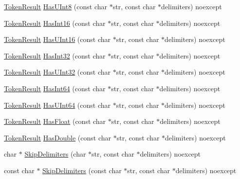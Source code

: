 \begin{DoxyCompactItemize}
\item 
\hyperlink{namespacemage_a2178ba2411db5912f41b2e7698c2037d}{Token\+Result} \hyperlink{namespacemage_ac2478814d8f43d6217c54f97c4fd3034}{Has\+U\+Int8} (const char $\ast$str, const char $\ast$delimiters) noexcept
\item 
\hyperlink{namespacemage_a2178ba2411db5912f41b2e7698c2037d}{Token\+Result} \hyperlink{namespacemage_a0436390022f56adaede7113217ca8333}{Has\+Int16} (const char $\ast$str, const char $\ast$delimiters) noexcept
\item 
\hyperlink{namespacemage_a2178ba2411db5912f41b2e7698c2037d}{Token\+Result} \hyperlink{namespacemage_a52a49efce40c0ad5c50340036e7a74fa}{Has\+U\+Int16} (const char $\ast$str, const char $\ast$delimiters) noexcept
\item 
\hyperlink{namespacemage_a2178ba2411db5912f41b2e7698c2037d}{Token\+Result} \hyperlink{namespacemage_ab476d1a2ac6d4f0459ccdc5f84445b68}{Has\+Int32} (const char $\ast$str, const char $\ast$delimiters) noexcept
\item 
\hyperlink{namespacemage_a2178ba2411db5912f41b2e7698c2037d}{Token\+Result} \hyperlink{namespacemage_a5d4c13b907e688d2a743aabd15e61821}{Has\+U\+Int32} (const char $\ast$str, const char $\ast$delimiters) noexcept
\item 
\hyperlink{namespacemage_a2178ba2411db5912f41b2e7698c2037d}{Token\+Result} \hyperlink{namespacemage_a51c4032544fb55800a905ccd85ca5e99}{Has\+Int64} (const char $\ast$str, const char $\ast$delimiters) noexcept
\item 
\hyperlink{namespacemage_a2178ba2411db5912f41b2e7698c2037d}{Token\+Result} \hyperlink{namespacemage_af018725ebdee13dad295cc607db93f38}{Has\+U\+Int64} (const char $\ast$str, const char $\ast$delimiters) noexcept
\item 
\hyperlink{namespacemage_a2178ba2411db5912f41b2e7698c2037d}{Token\+Result} \hyperlink{namespacemage_a6f2a789cad13443930a6edb96a05c32b}{Has\+Float} (const char $\ast$str, const char $\ast$delimiters) noexcept
\item 
\hyperlink{namespacemage_a2178ba2411db5912f41b2e7698c2037d}{Token\+Result} \hyperlink{namespacemage_a6264a671d1957908b6a4dc603a3bcdbe}{Has\+Double} (const char $\ast$str, const char $\ast$delimiters) noexcept
\item 
char $\ast$ \hyperlink{namespacemage_a66ebc90ee456bc298de657fce4586fd7}{Skip\+Delimiters} (char $\ast$str, const char $\ast$delimiters) noexcept
\item 
const char $\ast$ \hyperlink{namespacemage_a2bd955a8de0502e298a8435122e7a093}{Skip\+Delimiters} (const char $\ast$str, const char $\ast$delimiters) noexcept

\end{DoxyCompactItemize}
